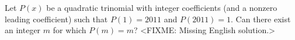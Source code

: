 \problem
Let $P(x)$ be a quadratic trinomial with integer coefficients
(and a nonzero leading coefficient) such that $P(1) = 2011$ and $P(2011) = 1$.
Can there exist an integer $m$ for which $P(m) = m$?
\solution
<FIXME: Missing English solution.>
\endproblem
